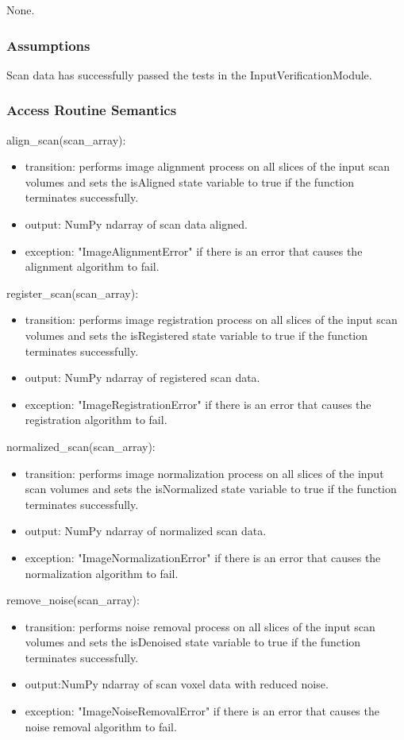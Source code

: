 \documentclass[12pt, titlepage]{article}
\begin{document}
None.

\subsubsection{Assumptions}

Scan data has successfully passed the tests in the InputVerificationModule.
\subsubsection{Access Routine Semantics}

\noindent align\_scan(scan\_array):
\begin{itemize}
  \item transition: performs image alignment process on all slices of
        the input scan volumes and sets the isAligned state variable to true
        if the function terminates successfully.
  \item output: NumPy ndarray of scan data aligned.
  \item exception: "ImageAlignmentError" if there is an error that causes the
        alignment algorithm to fail.
\end{itemize}
\noindent register\_scan(scan\_array):
\begin{itemize}
  \item transition: performs image registration process on all slices of
        the input scan volumes and sets the isRegistered state variable to true
        if the function terminates successfully.
  \item output: NumPy ndarray of registered scan data.
  \item exception: "ImageRegistrationError" if there is an error that causes the
        registration algorithm to fail.
\end{itemize}
\noindent normalized\_scan(scan\_array):
\begin{itemize}
  \item transition: performs image normalization process on all slices of
        the input scan volumes and sets the isNormalized state variable to true
        if the function terminates successfully.
  \item output: NumPy ndarray of normalized scan data.
  \item exception: "ImageNormalizationError" if there is an error that causes the
        normalization algorithm to fail.
\end{itemize}
\noindent remove\_noise(scan\_array):
\begin{itemize}
  \item transition: performs noise removal process on all slices of
        the input scan volumes and sets the isDenoised state variable to true
        if the function terminates successfully.
  \item output:NumPy ndarray of scan voxel data with reduced noise.
  \item exception: "ImageNoiseRemovalError" if there is an error that causes the
        noise removal algorithm to fail.
\end{itemize}
\end{document}
